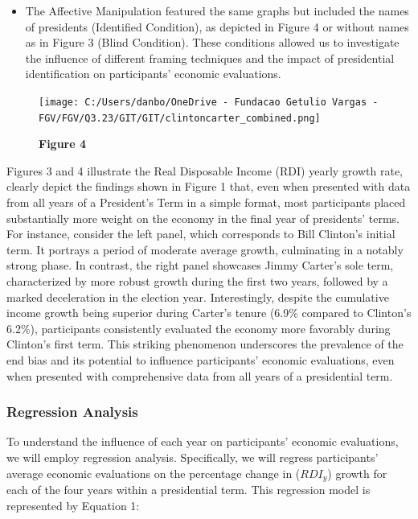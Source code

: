 \documentclass[
]{article}
\providecommand{\tightlist}{%
  \setlength{\itemsep}{0pt}\setlength{\parskip}{0pt}}
\begin{document}
\begin{itemize}
\tightlist
\item
  The Affective Manipulation featured the same graphs but included the
  names of presidents (Identified Condition), as depicted in Figure 4 or
  without names as in Figure 3 (Blind Condition). These conditions
  allowed us to investigate the influence of different framing
  techniques and the impact of presidential identification on
  participants' economic evaluations.
\end{itemize}

\begin{figure}
\centering
\texttt{[image: C:/Users/danbo/OneDrive - Fundacao Getulio Vargas - FGV/FGV/Q3.23/GIT/GIT/clintoncarter\_combined.png]}
\caption{\textbf{Figure 4}}
\end{figure}

Figures 3 and 4 illustrate the Real Disposable Income (RDI) yearly
growth rate, clearly depict the findings shown in Figure 1 that, even
when presented with data from all years of a President's Term in a
simple format, most participants placed substantially more weight on the
economy in the final year of presidents' terms. For instance, consider
the left panel, which corresponds to Bill Clinton's initial term. It
portrays a period of moderate average growth, culminating in a notably
strong phase. In contrast, the right panel showcases Jimmy Carter's sole
term, characterized by more robust growth during the first two years,
followed by a marked deceleration in the election year. Interestingly,
despite the cumulative income growth being superior during Carter's
tenure (6.9\% compared to Clinton's 6.2\%), participants consistently
evaluated the economy more favorably during Clinton's first term. This
striking phenomenon underscores the prevalence of the end bias and its
potential to influence participants' economic evaluations, even when
presented with comprehensive data from all years of a presidential term.

\hypertarget{regression-analysis}{%
\subsubsection{Regression Analysis}\label{regression-analysis}}

To understand the influence of each year on participants' economic
evaluations, we will employ regression analysis. Specifically, we will
regress participants' average economic evaluations on the percentage
change in (\(RDI_y\)) growth for each of the four years within a
presidential term. This regression model is represented by Equation 1:
\end{document}
